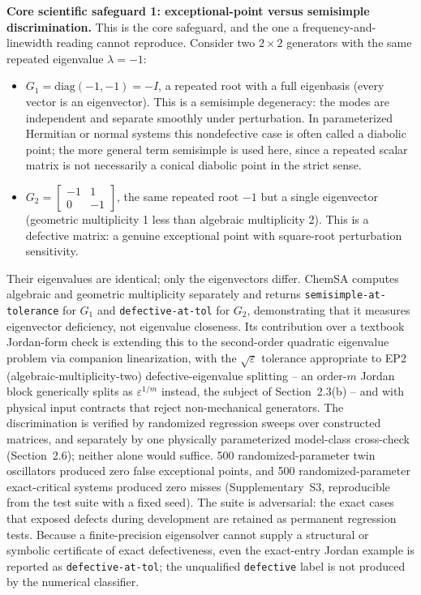 \textbf{Core scientific safeguard 1: exceptional-point versus semisimple discrimination.} This is the core safeguard, and the one a frequency-and-linewidth reading cannot reproduce. Consider two \(2\times2\) generators with the same repeated eigenvalue \(\lambda = -1\):
\begin{itemize}
\item \(G_1 = \mathrm{diag}(-1,-1) = -I\), a repeated root with a full eigenbasis (every vector is an eigenvector). This is a semisimple degeneracy: the modes are independent and separate smoothly under perturbation. In parameterized Hermitian or normal systems this nondefective case is often called a diabolic point; the more general term semisimple is used here, since a repeated scalar matrix is not necessarily a conical diabolic point in the strict sense.
\item \(G_2 = \left[\begin{smallmatrix}-1 & 1\\ 0 & -1\end{smallmatrix}\right]\), the same repeated root \(-1\) but a single eigenvector (geometric multiplicity 1 less than algebraic multiplicity 2). This is a defective matrix: a genuine exceptional point with square-root perturbation sensitivity.
\end{itemize}
Their eigenvalues are identical; only the eigenvectors differ. ChemSA computes algebraic and geometric multiplicity separately and returns \texttt{semisimple-at-tolerance} for \(G_1\) and \texttt{defective-at-tol} for \(G_2\), demonstrating that it measures eigenvector deficiency, not eigenvalue closeness. Its contribution over a textbook Jordan-form check is extending this to the second-order quadratic eigenvalue problem via companion linearization, with the \(\sqrt{\varepsilon}\) tolerance appropriate to EP2 (algebraic-multiplicity-two) defective-eigenvalue splitting -- an order-\(m\) Jordan block generically splits as \(\varepsilon^{1/m}\) instead, the subject of Section~2.3(b) -- and with physical input contracts that reject non-mechanical generators. The discrimination is verified by randomized regression sweeps over constructed matrices, and separately by one physically parameterized model-class cross-check (Section~2.6); neither alone would suffice. 500 randomized-parameter twin oscillators produced zero false exceptional points, and 500 randomized-parameter exact-critical systems produced zero misses (Supplementary~S3, reproducible from the test suite with a fixed seed). The suite is adversarial: the exact cases that exposed defects during development are retained as permanent regression tests. Because a finite-precision eigensolver cannot supply a structural or symbolic certificate of exact defectiveness, even the exact-entry Jordan example is reported as \texttt{defective-at-tol}; the unqualified \texttt{defective} label is not produced by the numerical classifier.

